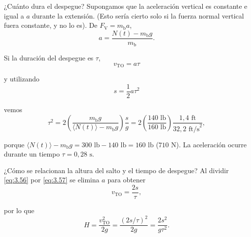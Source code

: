 \documentclass[12pt]{book}
\begin{document}
¿Cuánto dura el despegue? Supongamos que la aceleración vertical es constante e igual a $a$ durante la extensión. (Esto sería cierto solo si la fuerza normal vertical fuera constante, y no lo es). De $F_{\text{V}} = m_{\text{b}} a$,
\begin{equation}
a = \frac{N(t) - m_{\text{b}} g}{m_{\text{b}}}.
\label{eq:3.55}
\end{equation}

Si la duración del despegue es $\tau$,
\begin{equation}
v_{\text{TO}} = a \tau
\label{eq:3.56}
\end{equation}

y utilizando
\begin{equation}
s = \frac{1}{2} a \tau^2
\label{eq:3.57}
\end{equation}

vemos
\begin{equation}
\tau^2 = 2 \left( \frac{m_{\text{b}} g}{\langle N(t) \rangle - m_{\text{b}} g} \right) \frac{s}{g} = 2 \left( \frac{140\text{ lb}}{160\text{ lb}} \right) \frac{1,4\text{ ft}}{32,2\text{ ft/s}^2},
\label{eq:3.58}
\end{equation}

porque $\langle N(t) \rangle - m_{\text{b}} g = 300\text{ lb} - 140\text{ lb} = 160\text{ lb}$ ($710\text{ N}$). La aceleración ocurre durante un tiempo $\tau = 0,28\text{ s}$.

¿Cómo se relacionan la altura del salto y el tiempo de despegue? Al dividir \eqref{eq:3.56} por \eqref{eq:3.57} se elimina $a$ para obtener
\begin{equation}
v_{\text{TO}} = \frac{2s}{\tau},
\label{eq:3.59}
\end{equation}

por lo que
\begin{equation}
H = \frac{v_{\text{TO}}^2}{2g} = \frac{(2s/\tau)^2}{2g} = \frac{2s^2}{g \tau^2}.
\label{eq:3.60}
\end{equation}
\end{document}
